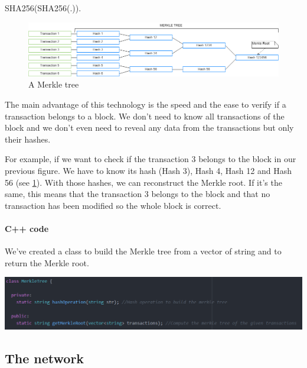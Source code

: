   SHA256(SHA256(.)).

  \begin{figure}[ht]
  \centering
  \includegraphics[width=\textwidth]{Figures/merkleTree}
  \caption{A Merkle tree}
  \label{merkleTree}
  \end{figure}
  \medskip

  The main advantage of this technology is the speed and the ease to verify if a transaction belongs to a block. We don't need to know all transactions of the block and we don't even need to reveal any data from the transactions but only their hashes. \newline

  For example, if we want to check if the transaction 3 belongs to the block in our previous figure. We have to know its hash (Hash 3), Hash 4, Hash 12 and Hash 56 (see \ref{merkleTree}). With those hashes, we can reconstruct the Merkle root. If it's the same, this means that the transaction 3 belongs to the block and that no transaction has been modified so the whole block is correct.


  \begin{aside}

  \paragraph{C++ code}

  We've created a class to build the Merkle tree from a vector of string and to return the Merkle root. \newline

  \includegraphics[width=14cm]{Figures/ClassMerkleTree}

  \end{aside}
  \medskip

  \subsection{The network}

